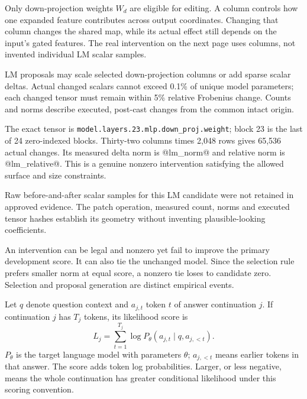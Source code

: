 Only down-projection weights $W_d$ are eligible for editing. A column controls how one expanded feature contributes across output coordinates. Changing that column changes the shared map, while its actual effect still depends on the input's gated features. The real intervention on the next page uses columns, not invented individual LM scalar samples.

LM proposals may scale selected down-projection columns or add sparse scalar deltas. Actual changed scalars cannot exceed 0.1\% of unique model parameters; each changed tensor must remain within 5\% relative Frobenius change. Counts and norms describe executed, post-cast changes from the common intact origin.


The exact tensor is \texttt{model.layers.23.mlp.down\_proj.weight}; block 23 is the last of 24 zero-indexed blocks. Thirty-two columns times 2,048 rows gives 65,536 actual changes. Its measured delta norm is @lm_norm@ and relative norm is @lm_relative@. This is a genuine nonzero intervention satisfying the allowed surface and size constraints.

Raw before-and-after scalar samples for this LM candidate were not retained in approved evidence. The patch operation, measured count, norms and executed tensor hashes establish its geometry without inventing plausible-looking coefficients.

An intervention can be legal and nonzero yet fail to improve the primary development score. It can also tie the unchanged model. Since the selection rule prefers smaller norm at equal score, a nonzero tie loses to candidate zero. Selection and proposal generation are distinct empirical events.

Let $q$ denote question context and $a_{j,t}$ token $t$ of answer continuation $j$. If continuation $j$ has $T_j$ tokens, its likelihood score is
\[
L_j=\sum_{t=1}^{T_j}\log P_\theta(a_{j,t}\mid q,a_{j,<t}).
\]
$P_\theta$ is the target language model with parameters $\theta$; $a_{j,<t}$ means earlier tokens in that answer. The score adds token log probabilities. Larger, or less negative, means the whole continuation has greater conditional likelihood under this scoring convention.

